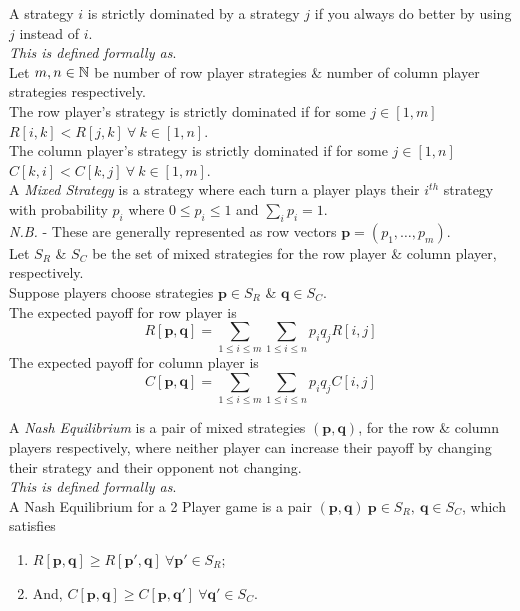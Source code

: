 \documentclass[11pt,a4paper]{article}
\begin{document}
A strategy $i$ is strictly dominated by a strategy $j$ if you always do better by using $j$ instead of $i$.\\
\textit{This is defined formally as}.\\
Let $m,n\in\mathbb{N}$ be number of row player strategies \& number of column player strategies respectively.\\
The row player's strategy is strictly dominated if for some $j\in[1,m]$\\
$R[i,k]<R[j,k]\ \forall\ k\in [1,n]$.\\
The column player's strategy is strictly dominated if for some $j\in[1,n]$\\
$C[k,i]<C[k,j]\ \forall\ k\in [1,m]$.\\

A \textit{Mixed Strategy} is a strategy where each turn a player plays their $i^{th}$ strategy with probability $p_i$ where $0\leq p_i\leq1$ and $\sum_ip_i=1$.\\
\textit{N.B.} - These are generally represented as row vectors $\textbf{p}=(p_1,\dots,p_m)$.\\

Let $S_R$ \& $S_C$ be the set of mixed strategies for the row player \& column player, respectively.\\
Suppose players choose strategies $\textbf{p}\in S_R$ \& $\textbf{q}\in S_C$.\\
The expected payoff for row player is $$R[\textbf{p},\textbf{q}]=\sum_{1\leq i\leq m}\sum_{1\leq i\leq n}p_iq_jR[i,j]$$
The expected payoff for column player is $$C[\textbf{p},\textbf{q}]=\sum_{1\leq i\leq m}\sum_{1\leq i\leq n}p_iq_jC[i,j]$$

A \textit{Nash Equilibrium} is a pair of mixed strategies $(\textbf{p},\textbf{q})$, for the row \& column players respectively, where neither player can increase their payoff by changing their strategy and their opponent not changing.\\
\textit{This is defined formally as}.\\
A Nash Equilibrium for a 2 Player game is a pair $(\textbf{p},\textbf{q})\ \textbf{p}\in S_R,\ \textbf{q}\in S_C$, which satisfies
\begin{enumerate}[label=\roman*)]
	\item $R[\textbf{p},\textbf{q}]\geq R[\textbf{p}',\textbf{q}]\ \forall \textbf{p}'\in S_R$;
	\item And, $C[\textbf{p},\textbf{q}]\geq C[\textbf{p},\textbf{q}']\ \forall \textbf{q}'\in S_C$.
\end{enumerate}
\end{document}
